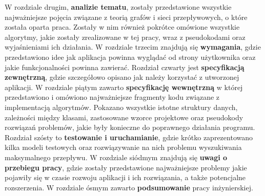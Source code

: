 W rozdziale drugim, \textbf{analizie tematu}, zostały przedstawione wszystkie najważniejsze pojęcia związane z teorią grafów i sieci przepływowych, o które została oparta praca. Zostały w nim również pokrótce omówione wszystkie algorytmy, jakie zostały zrealizowane w tej pracy, wraz z pseudokodami oraz wyjaśnieniami ich działania. W rozdziale trzecim znajdują się \textbf{wymagania}, gdzie przedstawiono idee jak aplikacja powinna wyglądać od strony użytkownika oraz jakie funkcjonalności powinna zawierać. Rozdział czwarty jest \textbf{specyfikacją zewnętrzną}, gdzie szczegółowo opisano jak należy korzystać z utworzonej aplikacji. W rozdziale piątym zawarto \textbf{specyfikację wewnętrzną} w której przedstawiono i omówiono najważniejsze fragmenty kodu związane z implementacją algorytmów. Pokazano wszystkie istotne struktury danych, zależności między klasami, zastosowane wzorce projektowe oraz pseudokody rozwiązań problemów, jakie były konieczne do poprawnego działania programu. Rozdział szósty to \textbf{testowanie i uruchamianie}, gdzie krótko zaprezentowano kilka modeli testowych oraz rozwiązywanie na nich problemu wyszukiwania maksymalnego przepływu. W rozdziale siódmym znajdują się \textbf{uwagi o przebiegu pracy}, gdzie zostały przedstawione najważniejsze problemy jakie pojawiły się w czasie rozwoju aplikacji i ich rozwiązania, a także potencjalne rozszerzenia. W rozdziale ósmym zawarto \textbf{podsumowanie} pracy inżynierskiej.
